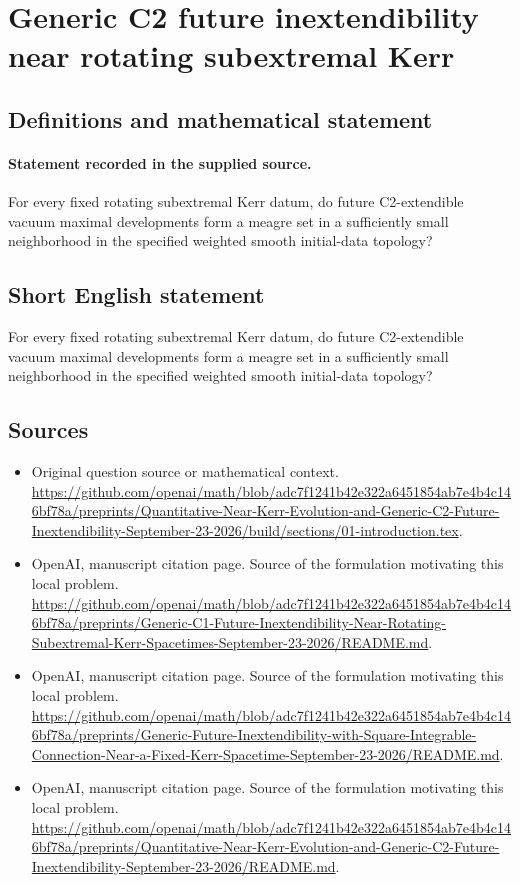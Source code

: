 \documentclass[11pt]{article}
\begin{document}
\section*{Generic C2 future inextendibility near rotating subextremal Kerr}\label{statement}
\subsection{Definitions and mathematical statement}
\paragraph{Statement recorded in the supplied source.}
For every fixed rotating subextremal Kerr datum, do future C2-extendible vacuum maximal developments form a meagre set in a sufficiently small neighborhood in the specified weighted smooth initial-data topology?
\subsection{Short English statement}
For every fixed rotating subextremal Kerr datum, do future C2-extendible vacuum maximal developments form a meagre set in a sufficiently small neighborhood in the specified weighted smooth initial-data topology?
\subsection{Sources}
\begin{itemize}
\item[S1] Original question source or mathematical context.
\url{https://github.com/openai/math/blob/adc7f1241b42e322a6451854ab7e4b4c146bf78a/preprints/Quantitative-Near-Kerr-Evolution-and-Generic-C2-Future-Inextendibility-September-23-2026/build/sections/01-introduction.tex}.
\item[S2] OpenAI, manuscript citation page. Source of the formulation motivating this local problem.
\url{https://github.com/openai/math/blob/adc7f1241b42e322a6451854ab7e4b4c146bf78a/preprints/Generic-C1-Future-Inextendibility-Near-Rotating-Subextremal-Kerr-Spacetimes-September-23-2026/README.md}.
\item[S3] OpenAI, manuscript citation page. Source of the formulation motivating this local problem.
\url{https://github.com/openai/math/blob/adc7f1241b42e322a6451854ab7e4b4c146bf78a/preprints/Generic-Future-Inextendibility-with-Square-Integrable-Connection-Near-a-Fixed-Kerr-Spacetime-September-23-2026/README.md}.
\item[S4] OpenAI, manuscript citation page. Source of the formulation motivating this local problem.
\url{https://github.com/openai/math/blob/adc7f1241b42e322a6451854ab7e4b4c146bf78a/preprints/Quantitative-Near-Kerr-Evolution-and-Generic-C2-Future-Inextendibility-September-23-2026/README.md}.
\end{itemize}
\end{document}
